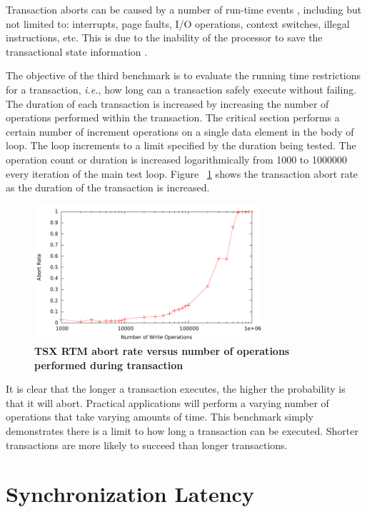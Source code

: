 \documentclass[11pt]{book}
\begin{document}
Transaction aborts can be caused by a number of run-time events \cite{intel_prog_ref},
including but not limited to: interrupts, page faults, I/O operations, context switches,
illegal instructions, etc.  This is due to the inability of the processor to save the
transactional state information \cite{schwahn}.

The objective of the third benchmark is to evaluate the running time
restrictions for a transaction, \emph{i.e.}, how long can a transaction safely
execute without failing.  The duration of each transaction is increased by
increasing the number of operations performed within the transaction. The
critical section performs a certain number of increment operations on a single
data element in the body of loop.  The loop increments to a limit specified by
the duration being tested.  The operation count or duration is increased
logarithmically from 1000 to 1000000 every iteration of the main test loop.
Figure ~\ref{fig:trx_duration} shows the transaction abort rate as the duration
of the transaction is increased.

\begin{figure}[H]
    \centering
    \graphicspath{ {./figures/} }
    \includegraphics[width=0.75\textwidth,keepaspectratio]{trxDuration}
    \caption{\textbf{TSX RTM abort rate versus number of operations performed
    during transaction}}
    \label{fig:trx_duration}
\end{figure}

It is clear that the longer a transaction executes, the higher the probability
is that it will abort.  Practical applications will perform a varying number of
operations that take varying amounts of time.  This benchmark simply
demonstrates there is a limit to how long a transaction can be executed.
Shorter transactions are more likely to succeed than longer transactions.

\section{Synchronization Latency}
\end{document}
